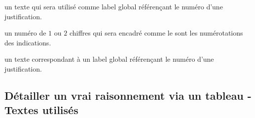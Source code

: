 \documentclass[12pt,a4paper]{article}
\begin{document}
\separation



\IDoption{} un texte qui sera utilisé comme label global référençant le numéro d'une justification.


\separation


  \hfill {}

\IDarg{} un numéro de $1$ ou $2$ chiffres qui sera encadré comme le sont les numérotations des indications.


\separation



\IDarg{} un texte correspondant à un label global référençant le numéro d'une justification.


\separation






\subsection{Détailler un \og vrai \fg{} raisonnement via un tableau - Textes utilisés}

   \hfill {}


\separation


     \hfill {}


   \hfill {}

   \hfill {}


\separation


   \hfill {} 

    \hfill {}

    \hfill {}

\extraspace

\end{document}
